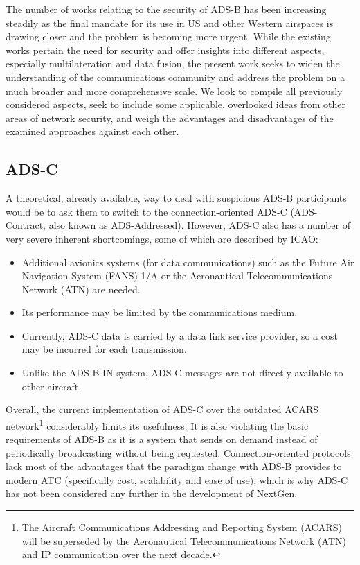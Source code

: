 \documentclass[english]{IEEEtran}
\begin{document}
The number of works relating to the security of ADS-B has been increasing
steadily as the final mandate for its use in US and other Western
airspaces is drawing closer and the problem is becoming more urgent.
While the existing works pertain the need for security and offer insights
into different aspects, especially multilateration and data fusion,
the present work seeks to widen the understanding of the communications
community and address the problem on a much broader and more comprehensive
scale. We look to compile all previously considered aspects, seek
to include some applicable, overlooked ideas from other areas of network
security, and weigh the advantages and disadvantages of the examined
approaches against each other. 


\subsection{ADS-C}

A theoretical, already available, way to deal with suspicious ADS-B
participants would be to ask them to switch to the connection-oriented
ADS-C (ADS-Contract, also known as ADS-Addressed). However, ADS-C
also has a number of very severe inherent shortcomings, some of which
are described by ICAO: \cite{Siu2011} 
\begin{itemize}
\item Additional avionics systems (for data communications) such as the
Future Air Navigation System (FANS) 1/A or the Aeronautical Telecommunications
Network (ATN) are needed.
\item Its performance may be limited by the communications medium.
\item Currently, ADS-C data is carried by a data link service provider,
so a cost may be incurred for each transmission.
\item Unlike the ADS-B IN system, ADS-C messages are not directly available
to other aircraft.
\end{itemize}
Overall, the current implementation of ADS-C over the outdated ACARS
network\footnote{The Aircraft Communications Addressing and Reporting System (ACARS)
will be superseded by the Aeronautical Telecommunications Network
(ATN) and IP communication over the next decade.} considerably limits its usefulness. It is also violating the basic
requirements of ADS-B as it is a system that sends on demand instead
of periodically broadcasting without being requested. Connection-oriented
protocols lack most of the advantages that the paradigm change with
ADS-B provides to modern ATC (specifically cost, scalability and ease
of use), which is why ADS-C has not been considered any further in
the development of NextGen.
\end{document}
